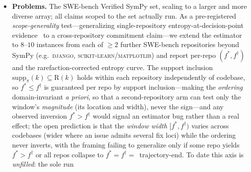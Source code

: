 \documentclass[11pt]{article}
\begin{document}
\begin{itemize}[leftmargin=1.4em,itemsep=2pt,topsep=2pt]
regardless of lineage, so $f^\ast\le f^\dagger$ is guaranteed per family and any
inversion would signal an estimator bug, not a real effect. The open prediction is
that Qwen collapses earlier (smaller $f^\ast$) than a less-aligned family while the
window $[f^\ast,f^\dagger)$ stays non-empty for at least one non-Qwen family; the
injectable-window policy is Qwen-specific only if every non-Qwen family yields
$f^\ast\approx f^\dagger$. Like the cross-repo axis, this one is \emph{unfilled}: the
sole completed run is the single degenerate Qwen SymPy instance above ($n=1$,
$f^\ast=0$, $\widehat{H}_{\mathrm{MM}}=0$ at every measured fraction
$\{0,0.5,0.9\}$). Here $f^\ast=0$ is the \emph{unconditioned} collapse
$|\mathrm{supp}_\pi(0)|=1$: free resampling ($k=0$, no prefix fixed) already yielded
a single behavioral outcome class, so on this instance the natural-support arm is
uninformative and cannot localize a window. The cross-family panel therefore stands
at zero non-Qwen families: this run fixes neither $f^\ast$ for any family nor the
cross-family contrast, and $f^\dagger$ still awaits the forced-diverse
reachable-support run.
\item \textbf{Problems.} The SWE-bench Verified SymPy set, scaling to a larger and
more diverse array; all claims scoped to the set actually run. As a pre-registered
\emph{scope-generality} test---generalizing single-repository entropy-at-decision-point
evidence~\citep{egb2025,catts2026} to a cross-repository commitment claim---we extend
the estimator to $8$--$10$ instances from each of $\geq\!2$ further SWE-bench
repositories beyond SymPy (e.g.\ \textsc{django}, \textsc{scikit-learn}/\textsc{matplotlib})
and report per-repo $(f^\ast,f^\dagger)$ and the rarefaction-corrected entropy curve.
The support inclusion $\mathrm{supp}_\pi(k)\subseteq\mathrm{R}(k)$ holds within each
repository independently of codebase, so $f^\ast\le f^\dagger$ is guaranteed
per repo by support inclusion---making the \emph{ordering} domain-invariant
\emph{a priori}, so that a second-repository arm can test only the window's
\emph{magnitude} (its location and width), never the sign---and any observed
inversion $f^\ast>f^\dagger$ would
signal an estimator bug rather than a real effect; the open prediction is that the
\emph{window width} $[f^\ast,f^\dagger)$ varies across codebases (wider where an issue
admits several fix loci) while the ordering never inverts, with the framing failing
to generalize only if some repo yields $f^\ast>f^\dagger$ or all repos collapse to
$f^\ast=f^\dagger=$~trajectory-end. To date this axis is \emph{unfilled}: the sole run

\end{itemize}
\end{document}
